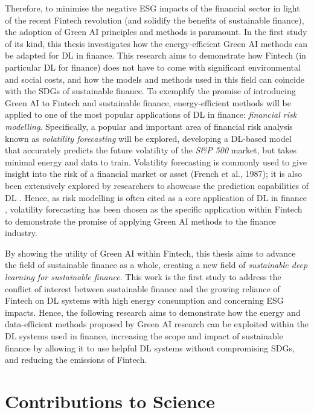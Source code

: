 \documentclass[a4paper, 11pt]{report}
\begin{document}
    Therefore, to minimise the negative ESG impacts of the financial sector in light of the recent Fintech revolution (and solidify the benefits of sustainable finance), the adoption of Green AI principles and methods is paramount. In the first study of its kind, this thesis investigates how the energy-efficient Green AI methods can be adapted for DL in finance. This research aims to demonstrate how Fintech (in particular DL for finance) does not have to come with significant environmental and social costs, and how the models and methods used in this field can coincide with the SDGs of sustainable finance. To exemplify the promise of introducing Green AI to Fintech and sustainable finance, energy-efficient methods will be applied to one of the most popular applications of DL in finance: \emph{financial risk modelling}. Specifically, a popular and important area of financial risk analysis known as \emph{volatility forecasting} will be explored, developing a DL-based model that accurately predicts the future volatility of the \emph{S\&P 500} market, but takes minimal energy and data to train. Volatility forecasting is commonly used to give insight into the risk of a financial market or asset (French et al., 1987); it is also been extensively explored by researchers to showcase the prediction capabilities of DL \citep{zhang-2022}. Hence, as risk modelling is often cited as a core application of DL in finance \citep{thakkar-2021}, volatility forecasting has been chosen as the specific application within Fintech to demonstrate the promise of applying Green AI methods to the finance industry.

    By showing the utility of Green AI within Fintech, this thesis aims to advance the field of sustainable finance as a whole, creating a new field of \emph{sustainable deep learning for sustainable finance}. This work is the first study to address the conflict of interest between sustainable finance and the growing reliance of Fintech on DL systems with high energy consumption and concerning ESG impacts. Hence, the following research aims to demonstrate how the energy and data-efficient methods proposed by Green AI research can be exploited within the DL systems used in finance, increasing the scope and impact of sustainable finance by allowing it to use helpful DL systems without compromising SDGs, and reducing the emissions of Fintech.


    \section{Contributions to Science}
    \label{section: contributions}
\end{document}
